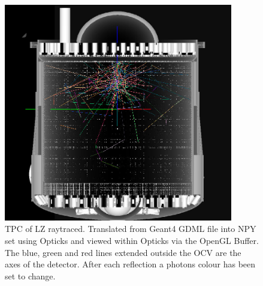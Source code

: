 \begin{figure}
\includegraphics[width=10cm]{Figures/Simulations/LZ_S1_photons_In_Opticks.png}
\centering
\caption{TPC of LZ raytraced. Translated from Geant4 GDML file into NPY set using Opticks and viewed within Opticks via the OpenGL Buffer.
The blue, green and red lines extended outside the OCV are the axes of the detector. After each reflection a photons colour has been set to change.}
\label{fig:OpticksLZTPC_S1_Photons}
\end{figure}